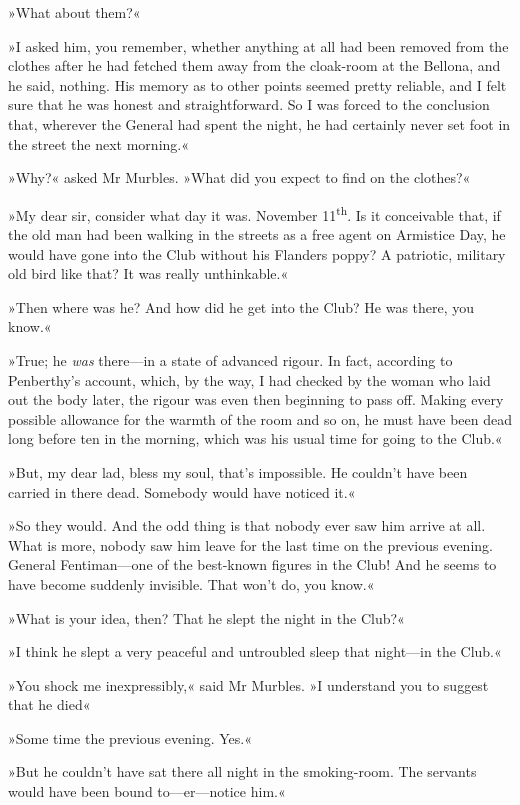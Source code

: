»What about them?«

»I asked him, you remember, whether anything at all had been removed from the clothes after he had fetched them away from the cloak-room at the Bellona, and he said, nothing. His memory as to other points seemed pretty reliable, and I felt sure that he was honest and straightforward. So I was forced to the conclusion that, wherever the General had spent the night, he had certainly never set foot in the street the next morning.«

»Why?« asked Mr Murbles. »What did you expect to find on the clothes?«

»My dear sir, consider what day it was. November 11\textsuperscript{th}. Is it conceivable that, if the old man had been walking in the streets as a free agent on Armistice Day, he would have gone into the Club without his Flanders poppy? A patriotic, military old bird like that? It was really unthinkable.«

»Then where was he? And how did he get into the Club? He was there, you know.«

»True; he \textit{was} there\allowbreak---\allowbreak in a state of advanced rigour. In fact, according to Penberthy's account, which, by the way, I had checked by the woman who laid out the body later, the rigour was even then beginning to pass off. Making every possible allowance for the warmth of the room and so on, he must have been dead long before ten in the morning, which was his usual time for going to the Club.«

»But, my dear lad, bless my soul, that's impossible. He couldn't have been carried in there dead. Somebody would have noticed it.«

»So they would. And the odd thing is that nobody ever saw him arrive at all. What is more, nobody saw him leave for the last time on the previous evening. General Fentiman\allowbreak---\allowbreak one of the best-known figures in the Club! And he seems to have become suddenly invisible. That won't do, you know.«

»What is your idea, then? That he slept the night in the Club?«

»I think he slept a very peaceful and untroubled sleep that night\allowbreak---\allowbreak in the Club.«

»You shock me inexpressibly,« said Mr Murbles. »I understand you to suggest that he died\longdash«

»Some time the previous evening. Yes.«

»But he couldn't have sat there all night in the smoking-room. The servants would have been bound to\allowbreak---\allowbreak er---notice him.«

